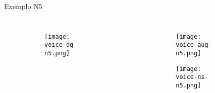 \begin{frame}{Exemplo N5}
    \begin{columns}
        \begin{figure}
            \begin{subfigure}{\textwidth}
                \centering
                \texttt{[image: voice-og-n5.png]}
            \end{subfigure}
        \end{figure}

        \begin{figure}
            \begin{subfigure}{\textwidth}
                \centering
                \texttt{[image: voice-aug-n5.png]}
            \end{subfigure}
            \begin{subfigure}{\textwidth}
                \centering
                \texttt{[image: voice-ns-n5.png]}
            \end{subfigure}
        \end{figure}
    \end{columns}
\end{frame}